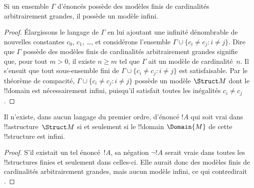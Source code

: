 \documentclass[../../../include/open-logic-section]{subfiles}
\begin{document}

\begin{thm}
Si un ensemble $\Gamma$ d'énoncés possède des modèles finis de
cardinalités arbitrairement grandes, il possède un modèle infini.
\end{thm}

\begin{proof}
Élargissons le langage de $\Gamma$ en lui ajoutant une infinité
dénombrable de nouvelles constantes $c_0$, $c_1$, \dots, et
considérons l'ensemble $\Gamma \cup \{c_i \neq c_j : i \neq j\}$.
Dire que $\Gamma$ possède des modèles finis de cardinalités
arbitrairement grandes signifie que, pour tout $m >0$, il existe
$n\ge m$ tel que $\Gamma$ ait un modèle de cardinalité~$n$.
Il s'ensuit que tout sous-ensemble fini de $\Gamma \cup
\{c_i \neq c_j : i \neq j\}$ est satisfaisable. Par le théorème de
compacité, $\Gamma \cup \{c_i \neq c_j : i \neq j\}$ possède un
modèle $\Struct M$ dont le
!!{domain} est nécessairement infini, puisqu'il satisfait toutes
les inégalités $c_i \neq c_j$.
\end{proof}

\begin{prop}
Il n'existe, dans aucun langage du premier ordre, d'énoncé $!A$ qui
soit vrai dans !!a{structure}~$\Struct M$ si et seulement si le
!!{domain} $\Domain{M}$ de cette !!{structure} est infini.
\end{prop}

\begin{proof}
S'il existait un tel énoncé~$!A$, sa négation $\lnot !A$ serait vraie
dans toutes les !!{structure}s finies et seulement dans celles-ci.
Elle aurait donc des modèles finis de cardinalités arbitrairement
grandes, mais aucun modèle infini, ce qui contredirait
.
\end{proof}
\end{document}
